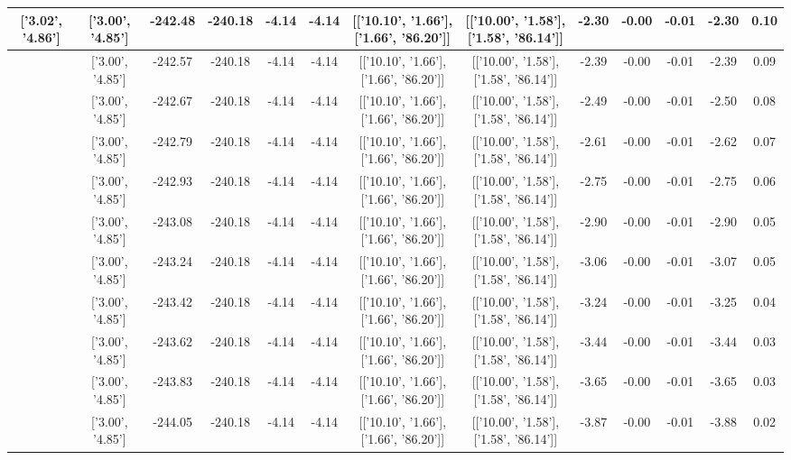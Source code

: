 \begin{table}[htbp]
\begin{adjustbox}{angle=90}
\begin{tabular}{|c|c|c|c|c|c|c|c|c|c|c|c|c|}
 ['3.02', '4.86'] & ['3.00', '4.85'] & -242.48 & -240.18 & -4.14 & -4.14 & [['10.10', '1.66'], ['1.66', '86.20']] & [['10.00', '1.58'], ['1.58', '86.14']] & -2.30 & -0.00 & -0.01 & -2.30 & 0.10\\ \hline
 ['3.02', '4.86'] & ['3.00', '4.85'] & -242.57 & -240.18 & -4.14 & -4.14 & [['10.10', '1.66'], ['1.66', '86.20']] & [['10.00', '1.58'], ['1.58', '86.14']] & -2.39 & -0.00 & -0.01 & -2.39 & 0.09\\ \hline
 ['3.03', '4.86'] & ['3.00', '4.85'] & -242.67 & -240.18 & -4.14 & -4.14 & [['10.10', '1.66'], ['1.66', '86.20']] & [['10.00', '1.58'], ['1.58', '86.14']] & -2.49 & -0.00 & -0.01 & -2.50 & 0.08\\ \hline
 ['3.03', '4.86'] & ['3.00', '4.85'] & -242.79 & -240.18 & -4.14 & -4.14 & [['10.10', '1.66'], ['1.66', '86.20']] & [['10.00', '1.58'], ['1.58', '86.14']] & -2.61 & -0.00 & -0.01 & -2.62 & 0.07\\ \hline
 ['3.04', '4.86'] & ['3.00', '4.85'] & -242.93 & -240.18 & -4.14 & -4.14 & [['10.10', '1.66'], ['1.66', '86.20']] & [['10.00', '1.58'], ['1.58', '86.14']] & -2.75 & -0.00 & -0.01 & -2.75 & 0.06\\ \hline
 ['3.04', '4.86'] & ['3.00', '4.85'] & -243.08 & -240.18 & -4.14 & -4.14 & [['10.10', '1.66'], ['1.66', '86.20']] & [['10.00', '1.58'], ['1.58', '86.14']] & -2.90 & -0.00 & -0.01 & -2.90 & 0.05\\ \hline
 ['3.04', '4.86'] & ['3.00', '4.85'] & -243.24 & -240.18 & -4.14 & -4.14 & [['10.10', '1.66'], ['1.66', '86.20']] & [['10.00', '1.58'], ['1.58', '86.14']] & -3.06 & -0.00 & -0.01 & -3.07 & 0.05\\ \hline
 ['3.05', '4.86'] & ['3.00', '4.85'] & -243.42 & -240.18 & -4.14 & -4.14 & [['10.10', '1.66'], ['1.66', '86.20']] & [['10.00', '1.58'], ['1.58', '86.14']] & -3.24 & -0.00 & -0.01 & -3.25 & 0.04\\ \hline
 ['3.05', '4.86'] & ['3.00', '4.85'] & -243.62 & -240.18 & -4.14 & -4.14 & [['10.10', '1.66'], ['1.66', '86.20']] & [['10.00', '1.58'], ['1.58', '86.14']] & -3.44 & -0.00 & -0.01 & -3.44 & 0.03\\ \hline
 ['3.05', '4.86'] & ['3.00', '4.85'] & -243.83 & -240.18 & -4.14 & -4.14 & [['10.10', '1.66'], ['1.66', '86.20']] & [['10.00', '1.58'], ['1.58', '86.14']] & -3.65 & -0.00 & -0.01 & -3.65 & 0.03\\ \hline
 ['3.06', '4.86'] & ['3.00', '4.85'] & -244.05 & -240.18 & -4.14 & -4.14 & [['10.10', '1.66'], ['1.66', '86.20']] & [['10.00', '1.58'], ['1.58', '86.14']] & -3.87 & -0.00 & -0.01 & -3.88 & 0.02\\ \hline

\end{tabular}
\end{adjustbox}
\end{table}
